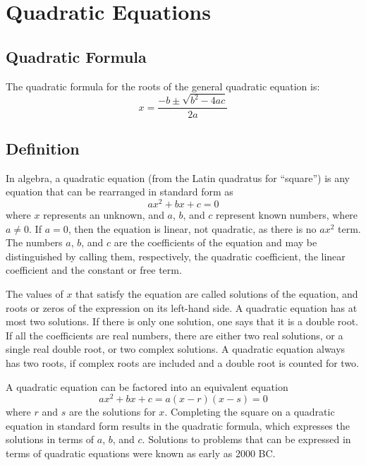 \section{Quadratic Equations}
\label{sec:quad-7bb4}
\subsection{Quadratic Formula}
\label{sss:quad-20dd}

The quadratic formula for the roots of the general quadratic equation is:
\[
x = \frac{-b \pm \sqrt{b^2 - 4ac}}{2a}
\]

\subsection{Definition}
\label{sss:defi-3061}

In algebra, a quadratic equation (from the Latin quadratus for ``square'') is any equation
that can be rearranged in standard form as
\[
ax^2 + bx + c = 0
\]
where $x$ represents an unknown, and $a$, $b$, and $c$ represent known numbers, where $a \neq 0$. If $a = 0$, then the equation is linear, not quadratic, as there is no $ax^2$ term. The numbers $a$, $b$, and $c$ are the coefficients of the equation and may be distinguished by calling them, respectively, the quadratic coefficient, the linear coefficient and the constant or free term.

The values of $x$ that satisfy the equation are called solutions of the equation, and roots or zeros of the expression on its left-hand side. A quadratic equation has at most two solutions. If there is only one solution, one says that it is a double root. If all the coefficients are real numbers, there are either two real solutions, or a single real double root, or two complex solutions. A quadratic equation always has two roots, if complex roots are included and a double root is counted for two.

A quadratic equation can be factored into an equivalent equation
\[
ax^2 + bx + c = a(x - r)(x - s) = 0
\]
where $r$ and $s$ are the solutions for $x$. Completing the square on a quadratic equation in standard form results in the quadratic formula, which expresses the solutions in terms of $a$, $b$, and $c$. Solutions to problems that can be expressed in terms of quadratic equations were known as early as 2000 BC.

